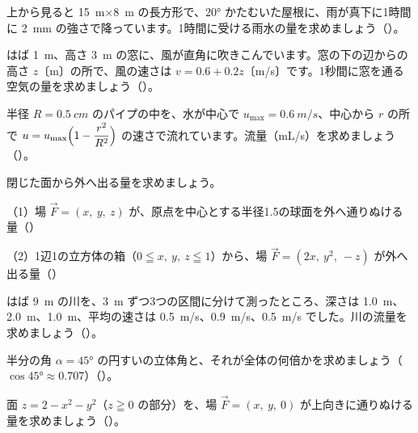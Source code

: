 \bkproblem 上から見ると \qty{15}{m}×\qty{8}{m} の長方形で、\ang{20} かたむいた屋根に、雨が真下に1時間に \qty{2}{mm} の強さで降っています。1時間に受ける雨水の量を求めましょう\mbox{（）}。

\bkproblem はば \qty{1}{m}、高さ \qty{3}{m} の窓に、風が直角に吹きこんでいます。窓の下の辺からの高さ $z$〔m〕の所で、風の速さは $v=0.6+0.2z$〔m/s〕です。1秒間に窓を通る空気の量を求めましょう\mbox{（）}。

\bkproblem 半径 $R=\qty{0.5}{cm}$ のパイプの中を、水が中心で $u_{\max}=\qty{0.6}{m/s}$、中心から $r$ の所で $u=u_{\max}\Bigl(1-\dfrac{r^2}{R^2}\Bigr)$ の速さで流れています。流量（mL/s）を求めましょう\mbox{（）}。

\bkproblem 閉じた面から外へ出る量を求めましょう。\par
（1）場 $\vec F=(x,\ y,\ z)$ が、原点を中心とする半径1.5の球面を外へ通りぬける量\mbox{（）}\par
（2）1辺1の立方体の箱（$0\leqq x,\ y,\ z\leqq1$）から、場 $\vec F=(2x,\ y^2,\ -z)$ が外へ出る量\mbox{（）}

\bkproblem はば \qty{9}{m} の川を、\qty{3}{m} ずつ3つの区間に分けて測ったところ、深さは \qty{1.0}{m}、\qty{2.0}{m}、\qty{1.0}{m}、平均の速さは \qty{0.5}{m/s}、\qty{0.9}{m/s}、\qty{0.5}{m/s} でした。川の流量を求めましょう\mbox{（）}。

\bkproblem 半分の角 $\alpha=\ang{45}$ の円すいの立体角と、それが全体の何倍かを求めましょう（$\cos\ang{45}\approx0.707$）\mbox{（）}。


\bkproblem 面 $z=2-x^2-y^2$（$z\geqq0$ の部分）を、場 $\vec F=(x,\ y,\ 0)$ が上向きに通りぬける量を求めましょう\mbox{（）}。

